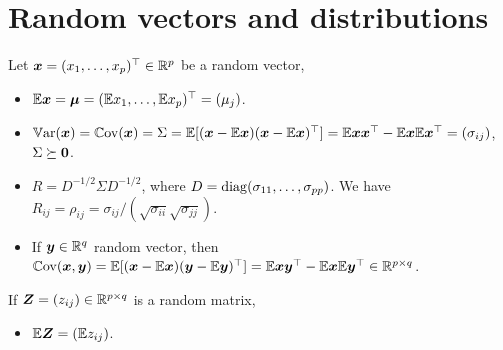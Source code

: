 \documentclass[10pt,a4paper]{book}
\begin{document}
\section{Random vectors and distributions}\label{sec:random_vector}
\begin{defbox}{}
	\begin{definition}\label{def:random_vector_moments}
		Let $\x=(x_1,\ldots, x_p)^\TT\in\bbR^p$ be a random vector, 
		\begin{itemize}
			\item {} $\bbE \x = \bam=(\bbE x_1,\ldots,\bbE x_p)^\TT=(\mu_j)$.
			\item {} $\Var(\x)=\Cov(\x)=\Sigma=\bbE[(\x-\bbE\x)(\x-\bbE\x)^\TT]=\bbE \x\x^\TT - \bbE \x \bbE \x^\TT = (\sigma_{ij})$, $\Sigma\succeq \0$.
			\item {} $R=D^{-1/2}\Sigma D^{-1/2}$, where $D=\diag(\sigma_{11},\ldots,\sigma_{pp})$. We have $R_{ij}=\rho_{ij}=\sigma_{ij}/(\sqrt{\sigma_{ii}}\sqrt{\sigma_{jj}})$.
			\item If $\y\in\bbR^{q}$ random vector, then $\Cov(\x,\y)=\bbE[(\x-\bbE\x)(\y-\bbE\y)^\TT]=\bbE\x\y^\TT-\bbE\x\bbE\y^\TT\in\bbR^{p\times q}$.  
		\end{itemize} 
		If $\Z=(z_{ij})\in\bbR^{p\times q}$ is a random matrix,
		\begin{itemize}
			\item $\bbE\Z=(\bbE z_{ij})$. 
		\end{itemize} 
	\end{definition}
\end{defbox}
\end{document}
